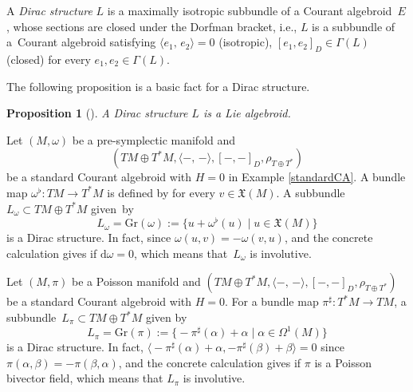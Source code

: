 \documentclass[pdftex]{sigma}
\numberwithin{equation}{section}
\newtheorem{Proposition}[Theorem]{Proposition}
 { \theoremstyle{definition}
\newtheorem{Definition}[Theorem]{Definition}
\newtheorem{Note}[Theorem]{Note}
\newtheorem{Example}[Theorem]{Example}
\newtheorem{Remark}[Theorem]{Remark}
\newtheorem{Question}[Theorem]{Question}
 }
\newcommand{\courant}[2]{{[{{#1},{#2}}]_D}}
\newcommand{\rhott}{\rho_{T \oplus T^*}}
\newcommand{\bracket}[2]{\langle #1,\,#2\rangle}
\newcommand{\rd}{\mathrm{d}}
\begin{document}
\begin{Definition}
A \emph{Dirac structure} $L$ is a
maximally isotropic subbundle of a Courant algebroid~$E$,
whose sections are closed under the Dorfman bracket,
i.e., $L$ is a subbundle of a~Courant algebroid satisfying
$
\bracket{e_1}{e_2}=0$ (isotropic),
$
 \courant{e_1}{e_2} \in \Gamma(L)$ (closed)
for every $e_1, e_2 \in \Gamma(L)$.
\end{Definition}

The following proposition is a basic fact for a Dirac structure.
\begin{Proposition}[\cite{LWX}]
A Dirac structure $L$ is a Lie algebroid.
\end{Proposition}

\begin{Example}\label{symplecticdirac}
Let $(M, \omega)$ be a pre-symplectic manifold and
\[(TM \oplus T^*M, \bracket{-}{-}, \courant{-}{-}, \allowbreak\rhott)\]
 be a
standard Courant algebroid with $H=0$ in Example \ref{standardCA}.
A bundle map $\omega^{\flat}\colon TM \rightarrow T^*M$ is defined
by  for every $v \in \mathfrak{X}(M)$.
A subbundle $L_{\omega} \subset TM \oplus T^*M$ given~by
\[
L_{\omega} = \mathrm{Gr}(\omega) := \bigl\{ u + \omega^{\flat}(u) \mid u \in \mathfrak{X}(M) \bigr\}\]
is a Dirac structure.
In fact,
since $\omega(u, v) = - \omega(v, u)$,
and the concrete calculation gives
 if $\rd \omega =0$, which means that~$L_{\omega}$ is involutive.
\end{Example}

\begin{Example}\label{Poissondirac}
Let $(M, \pi)$ be a Poisson manifold and
$(TM \oplus T^*M, \bracket{-}{-}, \courant{-}{-}, \rhott)$ be a
standard Courant algebroid with $H=0$.
For a bundle map $\pi^{\sharp}\colon T^*M \rightarrow TM$,
a subbundle~${L_{\pi} \subset TM \oplus T^*M}$ given by
\[%
L_{\pi} = \mathrm{Gr}(\pi) := \bigl\{ -\pi^{\sharp}(\alpha) + \alpha \mid \alpha \in \Omega^1(M) \bigr\}
\]
is a Dirac structure.
In fact,
$\bigl\langle-\pi^{\sharp}(\alpha) + \alpha,-\pi^{\sharp}(\beta) + \beta\bigr\rangle=0$
since $\pi(\alpha, \beta) = - \pi(\beta, \alpha)$,
and the concrete calculation gives
\smash{$
\bigl[-\pi^{\sharp}(\alpha) + \alpha,-\pi^{\sharp}(\beta) + \beta\bigr]
= -\pi^{\sharp}([\alpha, \beta]_{\pi}) + [\alpha, \beta]_{\pi}$}
if $\pi$ is a Poisson bivector field, which means that $L_{\pi}$ is involutive.
\end{Example}
\end{document}
